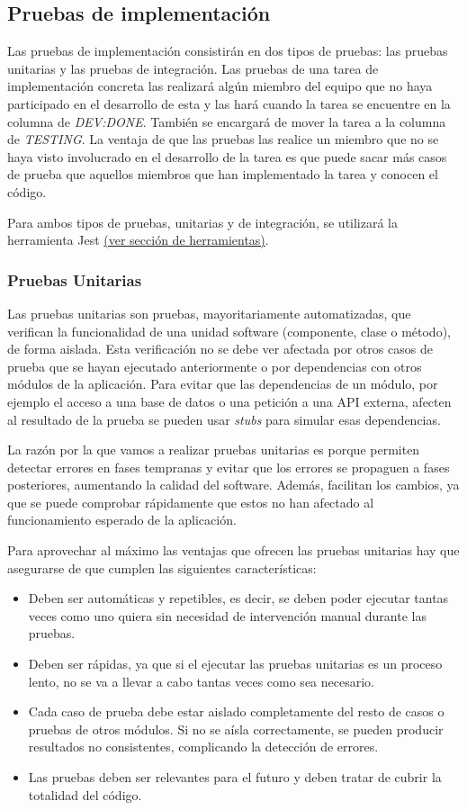 \subsection{Pruebas de implementación}
Las pruebas de implementación consistirán en dos tipos de pruebas: las pruebas unitarias y las pruebas de integración. Las pruebas de una tarea de implementación concreta las realizará algún miembro del equipo que no haya participado en el desarrollo de esta y las hará cuando la tarea se encuentre en la columna de \textit{DEV:DONE}. También se encargará de mover la tarea a la columna de \textit{TESTING}. La ventaja de que las pruebas las realice un miembro que no se haya visto involucrado en el desarrollo de la tarea es que puede sacar más casos de prueba que aquellos miembros que han implementado la tarea y conocen el código.

Para ambos tipos de pruebas, unitarias y de integración, se utilizará la herramienta Jest \underline{(ver sección de herramientas)}.
\subsubsection{Pruebas Unitarias}
Las pruebas unitarias son pruebas, mayoritariamente automatizadas, que verifican la funcionalidad de una unidad software (componente, clase o método), de forma aislada. Esta verificación no se debe ver afectada por otros casos de prueba que se hayan ejecutado anteriormente o por dependencias con otros módulos de la aplicación. Para evitar que las dependencias de un módulo, por ejemplo el acceso a una base de datos o una petición a una API externa, afecten al resultado de la prueba se pueden usar \textit{stubs} para simular esas dependencias.

La razón por la que vamos a realizar pruebas unitarias es porque permiten detectar errores en fases tempranas y evitar que los errores se propaguen a fases posteriores, aumentando la calidad del software. Además, facilitan los cambios, ya que se puede comprobar rápidamente que estos no han afectado al funcionamiento esperado de la aplicación.

Para aprovechar al máximo las ventajas que ofrecen las pruebas unitarias hay que asegurarse de que cumplen las siguientes características:
\begin{itemize}
    \item Deben ser automáticas y repetibles, es decir, se deben poder ejecutar tantas veces como uno quiera sin necesidad de intervención manual durante las pruebas.
    \item Deben ser rápidas, ya que si el ejecutar las pruebas unitarias es un proceso lento, no se va a llevar a cabo tantas veces como sea necesario.
    \item Cada caso de prueba debe estar aislado completamente del resto de casos o pruebas de otros módulos. Si no se aísla correctamente, se pueden producir resultados no consistentes, complicando la detección de errores.
    \item Las pruebas deben ser relevantes para el futuro y deben tratar de cubrir la totalidad del código.
\end{itemize}
